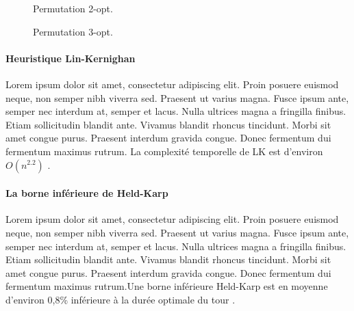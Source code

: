 \begin{figure}[hbt!]
  \centering
  \caption{Permutation 2-opt.}
  \label{fig:two-opt}
\end{figure}
\FloatBarrier

\begin{figure}[hbt!]
  \centering
  \caption{Permutation 3-opt.}
  \label{fig:three-opt}
\end{figure}
\FloatBarrier


\medskip

\paragraph{Heuristique Lin-Kernighan}
\label{par:lin-kernighan}
Lorem ipsum dolor sit amet, consectetur adipiscing elit. Proin posuere euismod neque, non semper nibh viverra sed. Praesent ut varius magna. Fusce ipsum ante, semper nec interdum at, semper et lacus. Nulla ultrices magna a fringilla finibus. Etiam sollicitudin blandit ante. Vivamus blandit rhoncus tincidunt. Morbi sit amet congue purus. Praesent interdum gravida congue. Donec fermentum dui fermentum maximus rutrum. La complexité temporelle de LK est d'environ $O(n^{2.2})$ \parencite{helsgaun_effective_2000}.

\medskip

\paragraph{La borne inférieure de Held-Karp }
\label{held-karp}
Lorem ipsum dolor sit amet, consectetur adipiscing elit. Proin posuere euismod neque, non semper nibh viverra sed. Praesent ut varius magna. Fusce ipsum ante, semper nec interdum at, semper et lacus. Nulla ultrices magna a fringilla finibus. Etiam sollicitudin blandit ante. Vivamus blandit rhoncus tincidunt. Morbi sit amet congue purus. Praesent interdum gravida congue. Donec fermentum dui fermentum maximus rutrum.Une borne inférieure Held-Karp est en moyenne d'environ 0,8\% inférieure à la durée optimale du tour \parencite{johnson_asymptotic_1996}.

